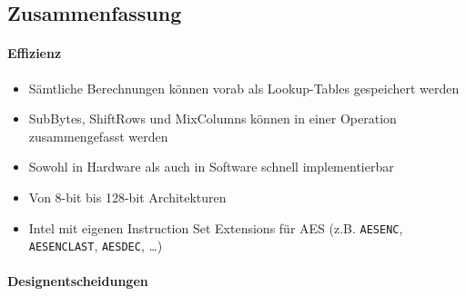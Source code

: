 \subsection{Zusammenfassung}

\paragraph{Effizienz}

\begin{itemize}
    \item Sämtliche Berechnungen können vorab als Lookup-Tables gespeichert werden
    \item SubBytes, ShiftRows und MixColumns können in einer Operation zusammengefasst werden
    \item Sowohl in Hardware als auch in Software schnell implementierbar
    \item Von 8-bit bis 128-bit Architekturen
    \item Intel mit eigenen Instruction Set Extensions für AES (z.B. \verb|AESENC|, \verb|AESENCLAST|, \verb|AESDEC|, \ldots)
\end{itemize}

\paragraph{Designentscheidungen}

